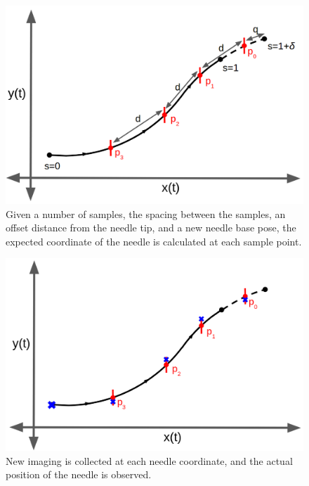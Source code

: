 \begin{figure}[h]
\includegraphics[width=1.0\textwidth]{Fig/chap3/curvefit_pt1.png}
\caption{Given a number of samples, the spacing between the samples, an offset distance from the needle tip, and a new needle base pose, the expected coordinate of the needle is calculated at each sample point.}
\label{fig:curve_fit_pt1}
\end{figure}

\begin{figure}[h]
\includegraphics[width=1.0\textwidth]{Fig/chap3/curvefit_pt2.png}
\caption{New imaging is collected at each needle coordinate, and the actual position of the needle is observed.}
\label{fig:curve_fit_pt2}
\end{figure}

